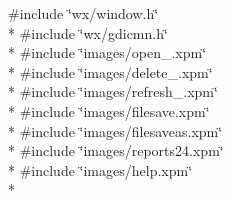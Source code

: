 {\ttfamily \#include \char`\"{}wx/window.\+h\char`\"{}}\\*
{\ttfamily \#include \char`\"{}wx/gdicmn.\+h\char`\"{}}\\*
{\ttfamily \#include \char`\"{}images/open\+\_.\+xpm\char`\"{}}\\*
{\ttfamily \#include \char`\"{}images/delete\+\_.\+xpm\char`\"{}}\\*
{\ttfamily \#include \char`\"{}images/refresh\+\_.\+xpm\char`\"{}}\\*
{\ttfamily \#include \char`\"{}images/filesave.\+xpm\char`\"{}}\\*
{\ttfamily \#include \char`\"{}images/filesaveas.\+xpm\char`\"{}}\\*
{\ttfamily \#include \char`\"{}images/reports24.\+xpm\char`\"{}}\\*
{\ttfamily \#include \char`\"{}images/help.\+xpm\char`\"{}}\\*
